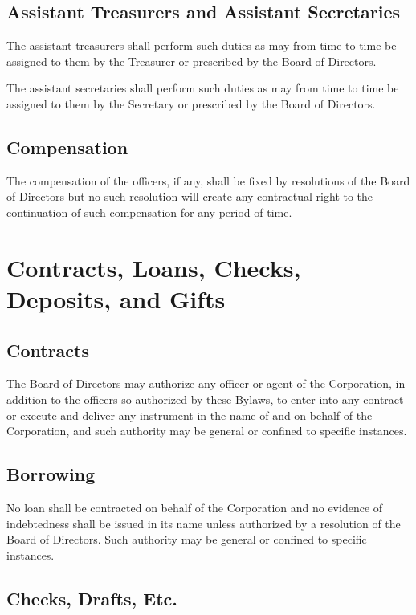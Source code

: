 \documentclass[12pt]{report}
\begin{document}
\section{Assistant Treasurers and Assistant Secretaries}

The assistant treasurers shall perform such duties as may from time to time be assigned to them by the Treasurer or prescribed by the Board of Directors.

The assistant secretaries shall perform such duties as may from time to time be assigned to them by the Secretary or prescribed by the Board of Directors.

\section{Compensation}

The compensation of the officers, if any, shall be fixed by resolutions of the Board of Directors but no such resolution will create any contractual right to the continuation of such compensation for any period of time.

\chapter{Contracts, Loans, Checks, Deposits, and Gifts}

\section{Contracts}

The Board of Directors may authorize any officer or agent of the Corporation, in addition to the officers so authorized by these Bylaws, to enter into any contract or execute and deliver any instrument in the name of and on behalf of the Corporation, and such authority may be general or confined to specific instances.

\section{Borrowing}

No loan shall be contracted on behalf of the Corporation and no evidence of indebtedness shall be issued in its name unless authorized by a resolution of the Board of Directors. Such authority may be general or confined to specific instances.

\section{Checks, Drafts, Etc.}
\end{document}
